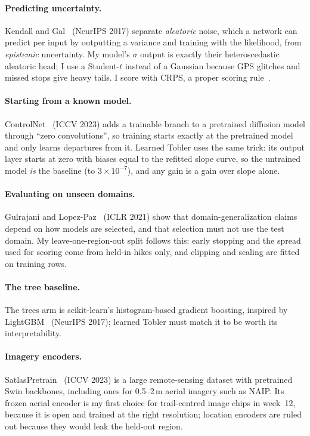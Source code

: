 \documentclass[10pt,twocolumn,letterpaper]{article}
\begin{document}
\paragraph{Predicting uncertainty.} Kendall and Gal~\cite{kendall2017uncertainties} (NeurIPS 2017) separate \emph{aleatoric} noise, which a network can predict per input by outputting a variance and training with the likelihood, from \emph{epistemic} uncertainty. My model's $\sigma$ output is exactly their heteroscedastic aleatoric head; I use a Student-$t$ instead of a Gaussian because GPS glitches and missed stops give heavy tails. I score with CRPS, a proper scoring rule~\cite{gneiting2007strictly}.

\paragraph{Starting from a known model.} ControlNet~\cite{zhang2023controlnet} (ICCV 2023) adds a trainable branch to a pretrained diffusion model through ``zero convolutions'', so training starts exactly at the pretrained model and only learns departures from it. Learned Tobler uses the same trick: its output layer starts at zero with biases equal to the refitted slope curve, so the untrained model \emph{is} the baseline (to $3\times10^{-7}$), and any gain is a gain over slope alone.

\paragraph{Evaluating on unseen domains.} Gulrajani and Lopez-Paz~\cite{gulrajani2021lost} (ICLR 2021) show that domain-generalization claims depend on how models are selected, and that selection must not use the test domain. My leave-one-region-out split follows this: early stopping and the spread used for scoring come from held-in hikes only, and clipping and scaling are fitted on training rows.

\paragraph{The tree baseline.} The trees arm is scikit-learn's histogram-based gradient boosting, inspired by LightGBM~\cite{ke2017lightgbm} (NeurIPS 2017); learned Tobler must match it to be worth its interpretability.

\paragraph{Imagery encoders.} SatlasPretrain~\cite{bastani2023satlaspretrain} (ICCV 2023) is a large remote-sensing dataset with pretrained Swin backbones, including ones for 0.5--2\,m aerial imagery such as NAIP. Its frozen aerial encoder is my first choice for trail-centred image chips in week~12, because it is open and trained at the right resolution; location encoders are ruled out because they would leak the held-out region.
\end{document}
